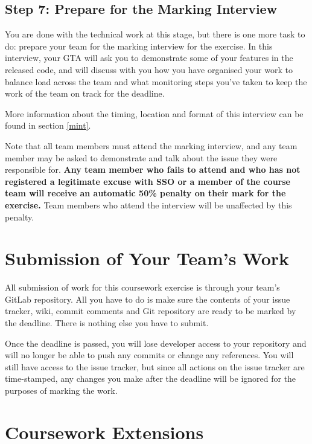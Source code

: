 \documentclass[
]{book}
\begin{document}
\hypertarget{interviewprep}{%
\subsection{Step 7: Prepare for the Marking Interview}\label{interviewprep}}

You are done with the technical work at this stage, but there is one more task to do: prepare your team for the marking interview for the exercise. In this interview, your GTA will ask you to demonstrate some of your features in the released code, and will discuss with you how you have organised your work to balance load across the team and what monitoring steps you've taken to keep the work of the team on track for the deadline.

More information about the timing, location and format of this interview can be found in section \ref{mint}.

Note that all team members must attend the marking interview, and any team member may be asked to demonstrate and talk about the issue they were responsible for. \textbf{Any team member who fails to attend and who has not registered a legitimate excuse with SSO or a member of the course team will receive an automatic 50\% penalty on their mark for the exercise.} Team members who attend the interview will be unaffected by this penalty.

\hypertarget{teamsubmit}{%
\section{Submission of Your Team's Work}\label{teamsubmit}}

All submission of work for this coursework exercise is through your team's GitLab repository. All you have to do is make sure the contents of your issue tracker, wiki, commit comments and Git repository are ready to be marked by the deadline. There is nothing else you have to submit.

Once the deadline is passed, you will lose developer access to your repository and will no longer be able to push any commits or change any references. You will still have access to the issue tracker, but since all actions on the issue tracker are time-stamped, any changes you make after the deadline will be ignored for the purposes of marking the work.

\hypertarget{xtensions}{%
\section{Coursework Extensions}\label{xtensions}}
\end{document}
